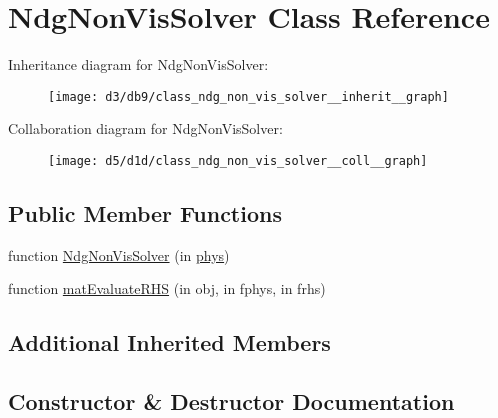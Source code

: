 \hypertarget{class_ndg_non_vis_solver}{}\section{Ndg\+Non\+Vis\+Solver Class Reference}
\label{class_ndg_non_vis_solver}


Inheritance diagram for Ndg\+Non\+Vis\+Solver\+:
\nopagebreak
\begin{figure}[H]
\begin{center}
\leavevmode
\texttt{[image: d3/db9/class\_ndg\_non\_vis\_solver\_\_inherit\_\_graph]}
\end{center}
\end{figure}


Collaboration diagram for Ndg\+Non\+Vis\+Solver\+:
\nopagebreak
\begin{figure}[H]
\begin{center}
\leavevmode
\texttt{[image: d5/d1d/class\_ndg\_non\_vis\_solver\_\_coll\_\_graph]}
\end{center}
\end{figure}
\subsection*{Public Member Functions}
\begin{DoxyCompactItemize}
\item 
function \hyperlink{class_ndg_non_vis_solver_a71f7e7ea1442b0e2485f7619dfc374ca}{Ndg\+Non\+Vis\+Solver} (in \hyperlink{class_ndg_abstract_vis_solver_a47663b482747f4136520112484ee2fcd}{phys})
\item 
function \hyperlink{class_ndg_non_vis_solver_a9cc083dc0574eab99c325f2389b8193e}{mat\+Evaluate\+R\+HS} (in obj, in fphys, in frhs)
\end{DoxyCompactItemize}
\subsection*{Additional Inherited Members}


\subsection{Constructor \& Destructor Documentation}
\mbox{\label{class_ndg_non_vis_solver_a71f7e7ea1442b0e2485f7619dfc374ca}} 

